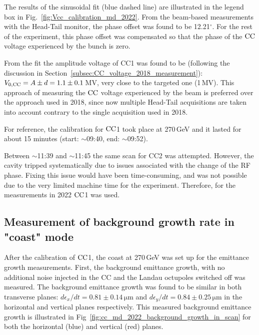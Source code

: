The results of the sinusoidal fit (blue dashed line) are illustrated in the legend box in Fig.~\ref{fig:Vcc_calibration_md_2022}. From the beam-based measurements with the Head-Tail monitor, the phase offset was found to be 12.21$^\circ$. For the rest of the experiment, this phase offset was compensated so that the phase of the ${\mathrm{CC}}$ voltage experienced by the bunch is zero. 


From the fit the amplitude voltage of CC1 was found to be (following the discussion in Section~\ref{subsec:CC_voltage_2018_measurement}): ${V_\mathrm{0, CC}}=A \pm d = 1.1 \pm 0.1$\,MV, very close to the targeted one (1\,MV). This approach of measuring the ${\mathrm{CC}}$ voltage experienced by the beam is preferred over the approach used in 2018, since now multiple Head-Tail acquisitions are taken into account contrary to the single acquisition used in 2018.  



For reference, the calibration for ${\mathrm{CC}}$1 took place at 270\,GeV and it lasted for about 15 minutes (start: $\sim$09:40, end: $\sim$09:52).

Between $\sim$11:39 and $\sim$11:45 the same scan for CC2 was attempted. However, the cavity tripped systematically due to issues associated with the change of the RF phase. Fixing this issue would have been time-consuming, and was not possible due to the very limited machine time for the experiment. Therefore, for the measurements in 2022 ${\mathrm{CC}}$1 was used.


\subsection{Measurement of background growth rate in "coast" mode}\label{subsec:measured_background_growth_cc_md_2022}
After the calibration of ${\mathrm{CC}}$1, the coast at 270\,GeV was set up for the emittance growth measurements. First, the background emittance growth, with no additional noise injected in the CC and the Landau octupoles switched off was measured. The background emittance growth was found to be similar in both transverse planes: $d\epsilon_x /dt=0.81 \pm 0.14$\,$\mathrm{\mu m}$ and $d\epsilon_y /dt=0.84 \pm0.25$\,$\mathrm{\mu m}$ in the horizontal and vertical planes respectively. This measured background emittance growth is illustrated in Fig~\ref{fig:cc_md_2022_background_growth_in_scan} for both the horizontal (blue) and vertical (red) planes.

